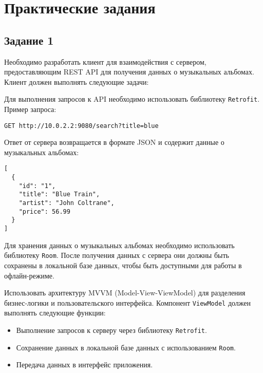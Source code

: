 \documentclass[a4paper,12pt]{article}
\begin{document}
\section*{Практические задания}
\subsection*{Задание 1}

Необходимо разработать клиент для взаимодействия с сервером, предоставляющим REST API для получения данных о музыкальных альбомах. Клиент должен выполнять следующие задачи:


Для выполнения запросов к API необходимо использовать библиотеку \texttt{Retrofit}. Пример запроса:

\begin{verbatim}
GET http://10.0.2.2:9080/search?title=blue
\end{verbatim}

Ответ от сервера возвращается в формате JSON и содержит данные о музыкальных альбомах:

\begin{verbatim}
[
  {
    "id": "1",
    "title": "Blue Train",
    "artist": "John Coltrane",
    "price": 56.99
  }
]
\end{verbatim}

Для хранения данных о музыкальных альбомах необходимо использовать библиотеку \texttt{Room}. После получения данных с сервера они должны быть сохранены в локальной базе данных, чтобы быть доступными для работы в офлайн-режиме.

Использовать архитектуру MVVM (Model-View-ViewModel) для разделения бизнес-логики и пользовательского интерфейса. Компонент \texttt{ViewModel} должен выполнять следующие функции:
\begin{itemize}
    \item Выполнение запросов к серверу через библиотеку \texttt{Retrofit}.
    \item Сохранение данных в локальной базе данных с использованием \texttt{Room}.
    \item Передача данных в интерфейс приложения.
\end{itemize}
\end{document}

